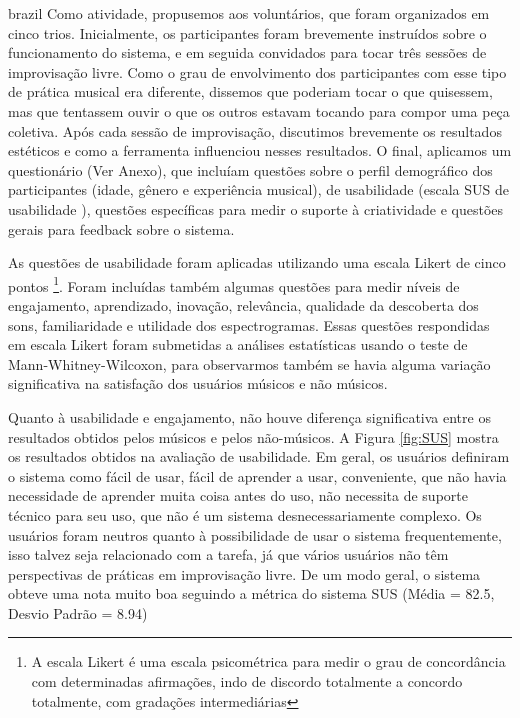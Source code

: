 \begin{otherlanguage*}{brazil}
Como atividade, propusemos aos voluntários, que foram organizados em cinco trios. Inicialmente, os participantes foram brevemente instruídos sobre o funcionamento do sistema, e em seguida convidados para tocar três sessões de improvisação livre. Como o grau de envolvimento dos participantes com esse tipo de prática musical era diferente, dissemos que poderiam tocar o que quisessem, mas que tentassem ouvir o que os outros estavam tocando para compor uma peça coletiva. Após cada sessão de improvisação, discutimos brevemente os resultados estéticos e como a ferramenta influenciou nesses resultados. O final, aplicamos um questionário (Ver Anexo), que incluíam questões sobre o perfil demográfico dos participantes (idade, gênero e experiência musical), de usabilidade (escala SUS de usabilidade \cite{Jordan1996}), questões específicas para medir o suporte à criatividade \cite{Cherry2014} e questões gerais para feedback sobre o sistema. 

As questões de usabilidade foram aplicadas utilizando uma escala Likert de cinco pontos \footnote{A escala Likert é uma escala psicométrica para medir o grau de concordância com determinadas afirmações, indo de discordo totalmente a concordo totalmente, com gradações intermediárias}. Foram incluídas também algumas questões para medir níveis de engajamento, aprendizado, inovação, relevância, qualidade da descoberta dos sons, familiaridade e utilidade dos espectrogramas. Essas questões respondidas em escala Likert foram submetidas a análises estatísticas usando o teste de Mann-Whitney-Wilcoxon, para observarmos também se havia alguma variação significativa na satisfação dos usuários músicos e não músicos.

Quanto à usabilidade e engajamento, não houve diferença significativa entre os resultados obtidos pelos músicos e pelos não-músicos. A Figura \ref{fig:SUS} mostra os resultados obtidos na avaliação de usabilidade. Em geral, os usuários definiram o sistema como fácil de usar, fácil de aprender a usar, conveniente, que não havia necessidade de aprender muita coisa antes do uso, não necessita de suporte técnico para seu uso, que não é um sistema desnecessariamente complexo. Os usuários foram neutros quanto à possibilidade de usar o sistema frequentemente, isso talvez seja relacionado com a tarefa, já que vários usuários não têm perspectivas de práticas em improvisação livre. De um modo geral, o sistema obteve uma nota muito boa seguindo a métrica do sistema SUS (Média = 82.5, Desvio Padrão = 8.94)


\end{otherlanguage*}
